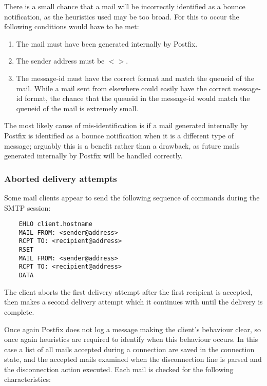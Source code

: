 \documentclass[a4paper,12pt,draft]{article}
\begin{document}
There is a small chance that a mail will be incorrectly identified as a
bounce notification, as the heuristics used may be too broad.  For this to
occur the following conditions would have to be met:

\begin{enumerate}

    \item The mail must have been generated internally by Postfix.

    \item The sender address must be $<>$.

    \item The message-id must have the correct format and match the queueid
        of the mail.  While a mail sent from elsewhere could easily have
        the correct message-id format, the chance that the queueid in the
        message-id would match the queueid of the mail is extremely small.

\end{enumerate}

The most likely cause of mis-identification is if a mail generated
internally by Postfix is identified as a bounce notification when it is a
different type of message; arguably this is a benefit rather than a
drawback, as future mails generated internally by Postfix will be handled
correctly.

\subsubsection{Aborted delivery attempts}

\label{aborted-delivery-attempts}

Some mail clients appear to send the following sequence of commands during
the SMTP session:

\begin{verbatim}
    EHLO client.hostname
    MAIL FROM: <sender@address>
    RCPT TO: <recipient@address>
    RSET
    MAIL FROM: <sender@address>
    RCPT TO: <recipient@address>
    DATA
\end{verbatim}

The client aborts the first delivery attempt after the first recipient is
accepted, then makes a second delivery attempt which it continues with
until the delivery is complete.

Once again Postfix does not log a message making the client's behaviour
clear, so once again heuristics are required to identify when this
behaviour occurs.  In this case a list of all mails accepted during a
connection are saved in the connection state, and the accepted mails
examined when the disconnection line is parsed and the disconnection action
executed.  Each mail is checked for the following characteristics:
\end{document}
